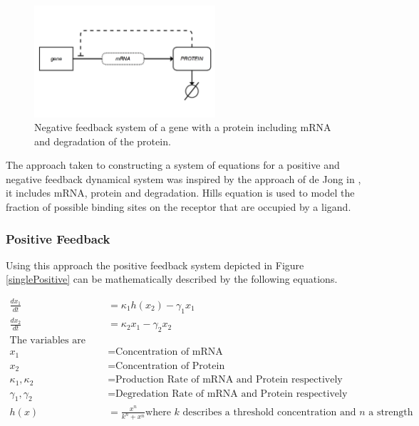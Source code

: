 \documentclass[]{article}
\begin{document}
        \begin{figure}[h!]
        \centering
        \includegraphics[width=0.6\textwidth]{./figures/singleNegative.png}
        \caption{Negative feedback system of a gene with a protein including mRNA and degradation of the protein.}
        \label{singleNegative}
        \end{figure}
        
        The approach taken to constructing a system of equations for a positive and negative feedback dynamical system was inspired by the approach of de Jong in \cite{slides}, it includes mRNA, protein and degradation. Hills equation is used to model the fraction of possible binding sites on the receptor that are occupied by a ligand. 
        
            \subsubsection{Positive Feedback} 
            Using this approach the positive feedback system depicted in Figure \ref{singlePositive} can be mathematically described by the following equations.
            
            \begin{align*}
                \frac{dx_1}{dt} &= \kappa_1 h(x_2) - \gamma_1 x_1 \\
                \frac{dx_2}{dt} &= \kappa_2x_1- \gamma_2 x_2\\
                \text{The variables are denoted as:}&\\
                x_1 &= \text{Concentration of mRNA}\\
                x_2 &= \text{Concentration of Protein}\\
                \kappa_1, \kappa_2 &= \text{Production Rate of mRNA and Protein respectively}\\
                \gamma_1, \gamma_2 &= \text{Degredation Rate of mRNA and Protein respectively}\\
                h(x) &= \frac{x^n}{k^n+x^n} \text{where $k$ describes a threshold concentration and $n$ a strength}
            \end{align*}
            
\end{document}
